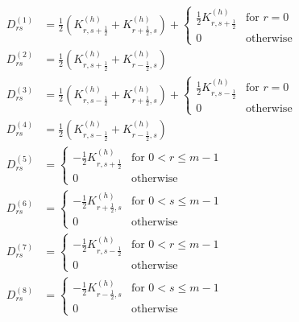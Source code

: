 \documentclass[11pt]{article}
\begin{document}
\begin{equation}
    \begin{aligned}
    D^{(1)}_{rs} &= \frac{1}{2}\left(K^{(h)}_{r,s+\frac{1}{2}}+K^{(h)}_{r+\frac{1}{2},s}\right) +
    \begin{cases}
    \frac{1}{2}K^{(h)}_{r,s+\frac{1}{2}} & \text{for $r=0$}\\
    0 & \text{otherwise}
    \end{cases}\\
    D^{(2)}_{rs} &= \frac{1}{2}\left(K^{(h)}_{r,s+\frac{1}{2}}+K^{(h)}_{r-\frac{1}{2},s}\right)\\
    D^{(3)}_{rs} &= \frac{1}{2}\left(K^{(h)}_{r,s-\frac{1}{2}}+K^{(h)}_{r+\frac{1}{2},s}\right) +
    \begin{cases}
    \frac{1}{2}K^{(h)}_{r,s-\frac{1}{2}} & \text{for $r=0$}\\
    0 & \text{otherwise}
    \end{cases}\\
    D^{(4)}_{rs} &= \frac{1}{2}\left(K^{(h)}_{r,s-\frac{1}{2}}+K^{(h)}_{r-\frac{1}{2},s}\right)\\
    D^{(5)}_{rs}  &= \begin{cases}
        -\frac{1}{2}K^{(h)}_{r,s+\frac{1}{2}} & \text{for $0< r\le m-1$}\\
        0 & \text{otherwise}
    \end{cases}\\
    D^{(6)}_{rs} &= \begin{cases}
        -\frac{1}{2}K^{(h)}_{r+\frac{1}{2},s} & \text{for $0< s\le m-1$}\\
        0 & \text{otherwise}
    \end{cases}\\
     D^{(7)}_{rs} &= \begin{cases}
        -\frac{1}{2}K^{(h)}_{r,s-\frac{1}{2}} & \text{for $0< r\le m-1$}\\
        0 & \text{otherwise}
    \end{cases}\\
     D^{(8)}_{rs} &= \begin{cases}
        -\frac{1}{2}K^{(h)}_{r-\frac{1}{2},s} & \text{for $0< s\le m-1$}\\
        0 & \text{otherwise}
    \end{cases}
    \end{aligned}
\end{equation}

\end{document}
